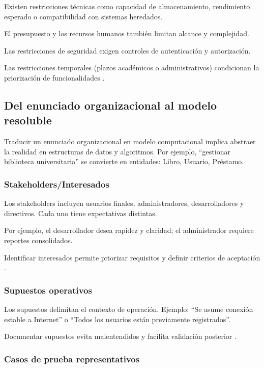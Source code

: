\documentclass[12pt,twoside]{book}
\begin{document}
						Existen restricciones técnicas como capacidad de almacenamiento, rendimiento esperado o compatibilidad con sistemas heredados.
						
						El presupuesto y los recursos humanos también limitan alcance y complejidad.
						
						Las restricciones de seguridad exigen controles de autenticación y autorización.
						
						Las restricciones temporales (plazos académicos o administrativos) condicionan la priorización de funcionalidades \cite{Sommerville2015Software}.
						
						\subsection{Del enunciado organizacional al modelo resoluble}
						
						Traducir un enunciado organizacional en modelo computacional implica abstraer la realidad en estructuras de datos y algoritmos. Por ejemplo, “gestionar biblioteca universitaria” se convierte en entidades: Libro, Usuario, Préstamo.
						
						\subsubsection{Stakeholders/Interesados}
						
						Los stakeholders incluyen usuarios finales, administradores, desarrolladores y directivos. Cada uno tiene expectativas distintas.
						
						Por ejemplo, el desarrollador desea rapidez y claridad; el administrador requiere reportes consolidados.
						
						Identificar interesados permite priorizar requisitos y definir criterios de aceptación \cite{ISOIECIEEE2018Requirements}.
						
						\subsubsection{Supuestos operativos}
						
						Los supuestos delimitan el contexto de operación. Ejemplo: “Se asume conexión estable a Internet” o “Todos los usuarios están previamente registrados”.
						
						Documentar supuestos evita malentendidos y facilita validación posterior \cite{Sommerville2015Software}.
						
						\subsubsection{Casos de prueba representativos}
						
\end{document}
